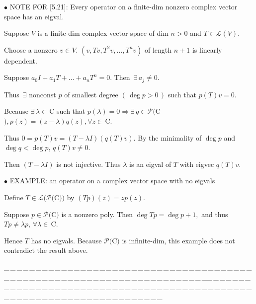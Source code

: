 \documentclass[a4paper, 11pt, UTF8]{article}
\def\Lm{\mathcal{L}}
\def\Po{\mathcal{P}}
\def\Cbf{$\,{\timesbf C}\,$}
\def\Cbfc{$\,{\timesbf C}$}
\begin{document}
\begin{large}
{\small $\bullet$} {\timesbf\Large N{\normalsize OTE} F{\normalsize OR} [5.21]:} {\timessl\normalsize Every operator on a finite-dim nonzero complex vector space has an eigval.}\par\quad
Suppose $V$ is a finite-dim complex vector space of dim $n > 0$ and $T\in\Lm(V)$.\par\quad
Choose a nonzero $v\in V$. $(v,Tv,T^2 v,\dots,T^n v)$ of length $n+1$ is linearly dependent.\par\quad
Suppose $a_0 I+a_1 T+\dots+a_n T^n=0.$ Then $\,\exists\,a_j\neq 0.$\par\quad
{\timessl Thus $\,\exists$ nonconst $p$ of smallest degree $(\,\deg p>0\,)$ such that $p(T)v = 0$.}\par\quad
Because $\exists\,\lambda \in \Cbf\,$such that $p(\lambda) = 0\Rightarrow\exists\,q \in\Po(${\timesbf C}$),p(z) = (z-\lambda)q(z),\forall z \in\Cbfc.$\par\quad
Thus $0 = p(T)v = (T -\lambda I)(q(T)v)$. By the minimality of $\deg p$ and $\deg q<\deg p$, $q(T)v \neq 0$.\par\quad Then $(T-\lambda I)$ is not injective. Thus $\lambda$ is an eigval of $T$ with eigvec $q(T)v$.\par
{\small $\bullet$} {\timesbf\Large E{\normalsize XAMPLE}:}
{\timessl\normalsize an operator on a complex vector space with no eigvals}\par\quad
Define $T\in\Lm(\Po(${\timesbf C}$))$ by $(Tp)(z) = zp(z)$.\par\quad
Suppose $p\in\Po(${\timesbf C}$)$ is a nonzero poly. Then $\deg Tp=\deg p+1,$ and thus $Tp\neq\lambda p,\,\forall\lambda\in\Cbfc.$\par\quad
Hence $T$ has no eigvals. 
Because $\Po(${\timesbf C}$)$ is infinite-dim, this example does not contradict the result above.\par
{\tiny \_\,\_\,\_\,\_\,\_\,\_\,\_\,\_\,\_\,\_\,\_\,\_\,\_\,\_\,\_\,\_\,\_\,\_\,\_\,\_\,\_\,\_\,\_\,\_\,\_\,\_\,\_\,\_\,\_\,\_\,\_\,\_\,\_\,\_\,\_\,\_\,\_\,\_\,\_\,\_\,\_\,\_\,\_\,\_\,\_\,\_\,\_\,\_\,\_\,\_\,\_\,\_\,\_\,\_\,\_\,\_\,\_\,\_\,\_\,\_\,\_\,\_\,\_\,\_\,\_\,\_\,\_\,\_\,\_\,\_\,\_\_\,\_\,\_\,\_\,\_\,\_\,\_\,\_\,\_\,\_\,\_\,\_\,\_\,\_\,\_\,\_\,\_\,\_\,\_\,\_\,\_\,\_\,\_\,\_\,\_\,\_\,\_\,\_\,\_\,\_\,\_\,\_\,\_\,\_\,\_\,\_\,\_\,\_\,\_\,\_\,\_\,\_\,\_\,\_\,\_\,\_\,\_\,\_\,\_\,\_\,\_\,\_\,\_\,\_\,\_\,\_\,\_\,\_\,\_\,\_\,\_\,\_\,\_\,\_\,\_\,\_\,\_\,\_\,\_\,\_\,\_}\par


\end{large}
\end{document}
